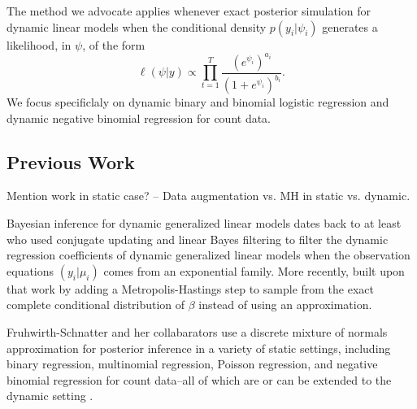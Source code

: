 \documentclass[11pt]{article}
\begin{document}
The method we advocate applies whenever exact posterior simulation for dynamic
linear models when the conditional density $p(y_i | \psi_i)$ generates a
likelihood, in $\psi$, of the form
\[
\ell(\psi | y) \propto \prod_{t=1}^T
\frac{(e^{\psi_i})^{a_i}}{(1+e^{\psi_i})^{b_i}}.
\]
We focus specificlaly on dynamic binary and binomial logistic regression and
dynamic negative binomial regression for count data.

\subsection{Previous Work}

Mention work in static case? -- Data augmentation vs. MH in static vs. dynamic.

Bayesian inference for dynamic generalized linear models dates back to at least
\cite{west-etal-1985} who used conjugate updating and linear Bayes filtering to
filter the dynamic regression coefficients of dynamic generalized linear models
when the observation equations $(y_i | \mu_i)$ comes from an exponential family.
More recently, \cite{ravines-etal-2006} built upon that work by adding a
Metropolis-Hastings step to sample from the exact complete conditional
distribution of $\beta$ instead of using an approximation.

Fruhwirth-Schnatter and her collabarators use a discrete mixture of normals
approximation for posterior inference in a variety of static settings, including
binary regression, multinomial regression, Poisson regression, and negative
binomial regression for count data--all of which are or can be extended to the
dynamic setting \citep{fruhwirth-schnatter-fruhwirth-2007,
  fruhwirth-schnatter-fruhwirth-2010, fruhwirth-schnatter-wagner-2006,
  fruhwirth-schnatter-etal-2009}.
\end{document}
